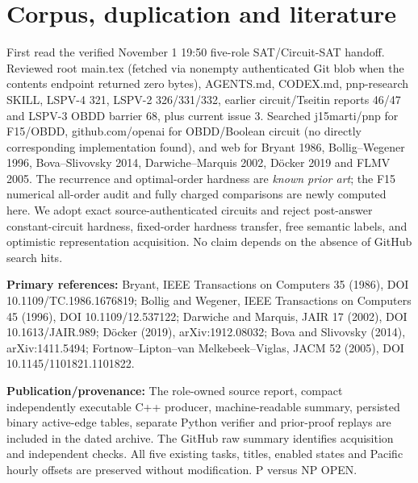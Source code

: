\documentclass[11pt]{article}
\begin{document}
\section{Corpus, duplication and literature}
First read the verified November 1 19:50 five-role SAT/Circuit-SAT handoff. Reviewed root main.tex (fetched via nonempty authenticated Git blob when the contents endpoint returned zero bytes), AGENTS.md, CODEX.md, pnp-research SKILL, LSPV-4 321, LSPV-2 326/331/332, earlier circuit/Tseitin reports 46/47 and LSPV-3 OBDD barrier 68, plus current issue 3. Searched j15marti/pnp for F15/OBDD, github.com/openai for OBDD/Boolean circuit (no directly corresponding implementation found), and web for Bryant 1986, Bollig--Wegener 1996, Bova--Slivovsky 2014, Darwiche--Marquis 2002, D\"ocker 2019 and FLMV 2005. The recurrence and optimal-order hardness are \emph{known prior art}; the F15 numerical all-order audit and fully charged comparisons are newly computed here. We adopt exact source-authenticated circuits and reject post-answer constant-circuit hardness, fixed-order hardness transfer, free semantic labels, and optimistic representation acquisition. No claim depends on the absence of GitHub search hits.

\noindent\textbf{Primary references:} Bryant, IEEE Transactions on Computers 35 (1986), DOI 10.1109/TC.1986.1676819; Bollig and Wegener, IEEE Transactions on Computers 45 (1996), DOI 10.1109/12.537122; Darwiche and Marquis, JAIR 17 (2002), DOI 10.1613/JAIR.989; D\"ocker (2019), arXiv:1912.08032; Bova and Slivovsky (2014), arXiv:1411.5494; Fortnow--Lipton--van Melkebeek--Viglas, JACM 52 (2005), DOI 10.1145/1101821.1101822.

\noindent\textbf{Publication/provenance:} The role-owned source report, compact independently executable C++ producer, machine-readable summary, persisted binary active-edge tables, separate Python verifier and prior-proof replays are included in the dated archive. The GitHub raw summary identifies acquisition and independent checks. All five existing tasks, titles, enabled states and Pacific hourly offsets are preserved without modification. P versus NP OPEN.
\end{document}
